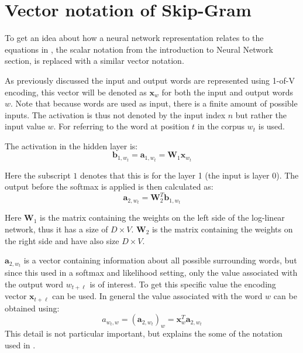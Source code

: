 \chapter{Vector notation of Skip-Gram}
\label{appendix:skipgram}

To get an idea about how a neural network representation relates to the equations in \cite{word2vec-details}, the scalar notation from the introduction to Neural Network section, is replaced with a similar vector notation.

As previously discussed the input and output words are represented using 1-of-V encoding, this vector will be denoted as $\mathbf{x}_w$ for both the input and output words $w$. Note that because words are used as input, there is a finite amount of possible inputs. The activation is thus not denoted by the input index $n$ but rather the input value $w$. For referring to the word at position $t$ in the corpus $w_t$ is used.

The activation in the hidden layer is:
\begin{equation}
\mathbf{b}_{1,w_t} = \mathbf{a}_{1,w_t} = \mathbf{W}_{1} \mathbf{x}_{w_t}
\end{equation}

Here the subscript $1$ denotes that this is for the layer 1 (the input is layer 0). The output before the softmax is applied is then calculated as:
\begin{equation}
\mathbf{a}_{2,w_t} = \mathbf{W}_2^T \mathbf{b}_{1,w_t}
\end{equation}

Here $\mathbf{W}_1$ is the matrix containing the weights on the left side of the log-linear network, thus it has a size of $D \times V$. $\mathbf{W}_2$ is the matrix containing the weights on the right side and have also size $D \times V$.

$\mathbf{a}_{2,w_t}$ is a vector containing information about all possible surrounding words, but since this used in a softmax and likelihood setting, only the value associated with the output word $w_{t + \ell}$ is of interest. To get this specific value the encoding vector $\mathbf{x}_{t + \ell}$ can be used. In general the value associated with the word $w$ can be obtained using:
\begin{equation}
a_{w_t,w} = \left(\mathbf{a}_{2,w_t}\right)_w = \mathbf{x}_{w}^T \mathbf{a}_{2,w_t}
\end{equation}
This detail is not particular important, but explains the some of the notation used in \cite{word2vec-details}.

